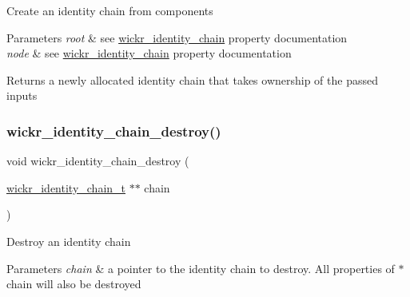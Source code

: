 Create an identity chain from components


\begin{DoxyParams}{Parameters}
{\em root} & see \textquotesingle{}\mbox{\hyperlink{structwickr__identity__chain}{wickr\+\_\+identity\+\_\+chain}}\textquotesingle{} property documentation \\
\hline
{\em node} & see \textquotesingle{}\mbox{\hyperlink{structwickr__identity__chain}{wickr\+\_\+identity\+\_\+chain}}\textquotesingle{} property documentation \\
\hline
\end{DoxyParams}
\begin{DoxyReturn}{Returns}
a newly allocated identity chain that takes ownership of the passed inputs 
\end{DoxyReturn}
\mbox{\label{group__wickr__identity_gadbddf6d49fddb2df103486970b3d564b}} 
\subsubsection{\texorpdfstring{wickr\+\_\+identity\+\_\+chain\+\_\+destroy()}{wickr\_identity\_chain\_destroy()}}
{\footnotesize\ttfamily void wickr\+\_\+identity\+\_\+chain\+\_\+destroy (\begin{DoxyParamCaption}\item[{\mbox{\hyperlink{structwickr__identity__chain}{wickr\+\_\+identity\+\_\+chain\+\_\+t}} $\ast$$\ast$}]{chain }\end{DoxyParamCaption})}

Destroy an identity chain


\begin{DoxyParams}{Parameters}
{\em chain} & a pointer to the identity chain to destroy. All properties of \textquotesingle{}$\ast$chain\textquotesingle{} will also be destroyed \\
\hline
\end{DoxyParams}
\mbox{\label{group__wickr__identity_ga12f5b33c4947b6a2ca3df3bdaacafa10}} 
